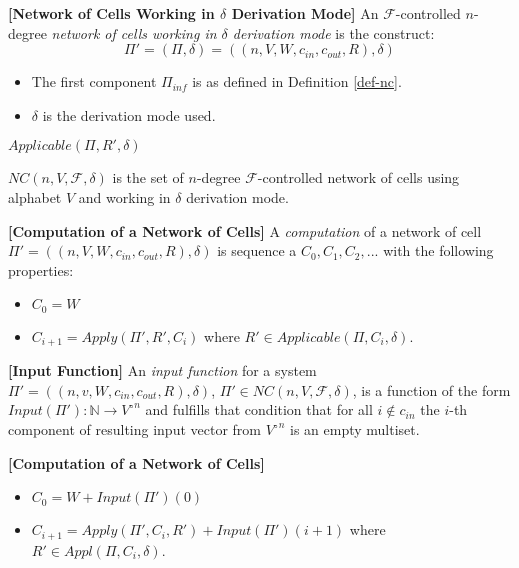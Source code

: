 \documentclass[a4paper]{article}
\theoremstyle{definition}
\newcommand{\ra}{\rightarrow}
\begin{document}

\label{def-nc3}\textbf{[Network of Cells Working in $\delta$ Derivation Mode]} An
$\mathscr{F}$-controlled $n$-degree \emph{network of cells working in $\delta$ derivation mode} is 
the construct: $$\Pi' = (\Pi,\delta) = ((n,V,W,c_{in},c_{out},R), \delta)$$
\begin{multicols}{2}
\begin{itemize}
\item The first component $\Pi_{inf}$ is as defined in Definition \ref{def-nc}.
\item $\delta$ is the derivation mode used.
\end{itemize}
\end{multicols}

$Applicable(\Pi, R', \delta)$

$NC(n,V,\mathscr{F},\delta)$ is the set of $n$-degree $\mathscr{F}$-controlled network of cells 
using alphabet $V$ and working in $\delta$ derivation mode.


\label{def-comp1}\textbf{[Computation of a Network of Cells]} A \emph{computation} of
a network of cell $\Pi' = ((n,V,W,c_{in},c_{out},R),\delta)$ is sequence a $C_0,C_1,C_2,...$ with 
the following properties:
\begin{itemize}
\item $C_0 = W$
\item $C_{i+1} = Apply(\Pi',R',C_i)$ where $R' \in Applicable(\Pi,C_i,\delta)$.
\end{itemize}


\label{def-input} \textbf{[Input Function]} An \emph{input function} for a system 
$\Pi'=((n,v,W,c_{in},c_{out},R),\delta)$, $\Pi' \in NC(n,V,\mathscr{F},\delta)$, is a function of
the form $Input(\Pi'): \mathbb{N} \ra {V^{\circ}}^{n}$ and fulfills that condition that for all
$i \notin c_{in}$ the $i$-th component of resulting input vector from ${V^{\circ}}^n$ is an empty
multiset.


\label{def-comp2} \textbf{[Computation of a Network of Cells]} 
\begin{itemize}
\item $C_0 = W + Input(\Pi')(0)$
\item $C_{i+1} = Apply(\Pi',C_i,R') + Input(\Pi')(i+1)$
where $R' \in Appl(\Pi, C_i, \delta)$.
\end{itemize}
\end{document}
